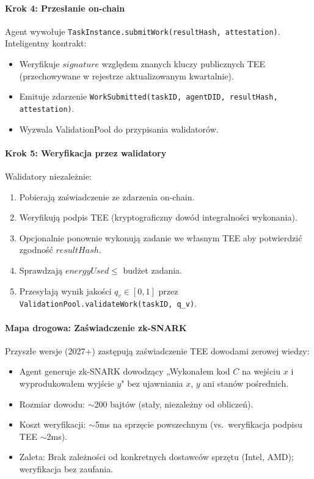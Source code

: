 \documentclass[11pt]{article}
\begin{document}
\paragraph{Krok 4: Przesłanie on-chain}
Agent wywołuje \texttt{TaskInstance.submitWork(resultHash, attestation)}. Inteligentny kontrakt:
\begin{itemize}[noitemsep]
  \item Weryfikuje $signature$ względem znanych kluczy publicznych TEE (przechowywane w rejestrze aktualizowanym kwartalnie).
  \item Emituje zdarzenie \texttt{WorkSubmitted(taskID, agentDID, resultHash, attestation)}.
  \item Wyzwala ValidationPool do przypisania walidatorów.
\end{itemize}

\paragraph{Krok 5: Weryfikacja przez walidatory}
Walidatory niezależnie:
\begin{enumerate}[noitemsep]
  \item Pobierają zaświadczenie ze zdarzenia on-chain.
  \item Weryfikują podpis TEE (kryptograficzny dowód integralności wykonania).
  \item Opcjonalnie ponownie wykonują zadanie we własnym TEE aby potwierdzić zgodność $resultHash$.
  \item Sprawdzają $energyUsed \leq$ budżet zadania.
  \item Przesyłają wynik jakości $q_v \in [0,1]$ przez \texttt{ValidationPool.validateWork(taskID, q\_v)}.
\end{enumerate}

\paragraph{Mapa drogowa: Zaświadczenie zk-SNARK}
Przyszłe wersje (2027+) zastępują zaświadczenie TEE dowodami zerowej wiedzy:
\begin{itemize}[noitemsep]
  \item Agent generuje zk-SNARK dowodzący „Wykonałem kod $C$ na wejściu $x$ i wyprodukowałem wyjście $y$" bez ujawniania $x$, $y$ ani stanów pośrednich.
  \item Rozmiar dowodu: $\sim$200 bajtów (stały, niezależny od obliczeń).
  \item Koszt weryfikacji: $\sim$5ms na sprzęcie powszechnym (vs.\ weryfikacja podpisu TEE $\sim$2ms).
  \item Zaleta: Brak zależności od konkretnych dostawców sprzętu (Intel, AMD); weryfikacja bez zaufania.
\end{itemize}
\end{document}
